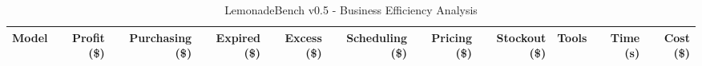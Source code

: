 \begin{table}[h]
\centering
\caption{LemonadeBench v0.5 - Business Efficiency Analysis}
\label{tab:lemonadebench_v05_efficiency}
\begin{tabular}{|l|r|r|r|r|r|r|r|r|r|r|}
\hline
\textbf{Model} & \textbf{Profit (\$)} & \textbf{Purchasing (\$)} & \textbf{Expired (\$)} & \textbf{Excess (\$)} & \textbf{Scheduling (\$)} & \textbf{Pricing (\$)} & \textbf{Stockout (\$)} & \textbf{Tools} & \textbf{Time (s)} & \textbf{Cost (\$)} \\
\hline
\end{tabular}
\end{table}
